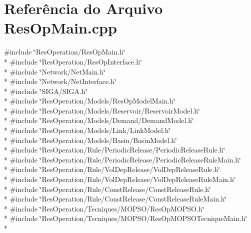 \section{Referência do Arquivo Res\+Op\+Main.\+cpp}
\label{_res_op_main_8cpp}
{\ttfamily \#include \char`\"{}Res\+Operation/\+Res\+Op\+Main.\+h\char`\"{}}\\*
{\ttfamily \#include \char`\"{}Res\+Operation/\+Res\+Op\+Interface.\+h\char`\"{}}\\*
{\ttfamily \#include \char`\"{}Network/\+Net\+Main.\+h\char`\"{}}\\*
{\ttfamily \#include \char`\"{}Network/\+Net\+Interface.\+h\char`\"{}}\\*
{\ttfamily \#include \char`\"{}S\+I\+G\+A/\+S\+I\+G\+A.\+h\char`\"{}}\\*
{\ttfamily \#include \char`\"{}Res\+Operation/\+Models/\+Res\+Op\+Model\+Main.\+h\char`\"{}}\\*
{\ttfamily \#include \char`\"{}Res\+Operation/\+Models/\+Reservoir/\+Reservoir\+Model.\+h\char`\"{}}\\*
{\ttfamily \#include \char`\"{}Res\+Operation/\+Models/\+Demand/\+Demand\+Model.\+h\char`\"{}}\\*
{\ttfamily \#include \char`\"{}Res\+Operation/\+Models/\+Link/\+Link\+Model.\+h\char`\"{}}\\*
{\ttfamily \#include \char`\"{}Res\+Operation/\+Models/\+Basin/\+Basin\+Model.\+h\char`\"{}}\\*
{\ttfamily \#include \char`\"{}Res\+Operation/\+Rule/\+Periodic\+Release/\+Periodic\+Release\+Rule.\+h\char`\"{}}\\*
{\ttfamily \#include \char`\"{}Res\+Operation/\+Rule/\+Periodic\+Release/\+Periodic\+Release\+Rule\+Main.\+h\char`\"{}}\\*
{\ttfamily \#include \char`\"{}Res\+Operation/\+Rule/\+Vol\+Dep\+Release/\+Vol\+Dep\+Release\+Rule.\+h\char`\"{}}\\*
{\ttfamily \#include \char`\"{}Res\+Operation/\+Rule/\+Vol\+Dep\+Release/\+Vol\+Dep\+Release\+Rule\+Main.\+h\char`\"{}}\\*
{\ttfamily \#include \char`\"{}Res\+Operation/\+Rule/\+Const\+Release/\+Const\+Release\+Rule.\+h\char`\"{}}\\*
{\ttfamily \#include \char`\"{}Res\+Operation/\+Rule/\+Const\+Release/\+Const\+Release\+Rule\+Main.\+h\char`\"{}}\\*
{\ttfamily \#include \char`\"{}Res\+Operation/\+Tecniques/\+M\+O\+P\+S\+O/\+Res\+Op\+M\+O\+P\+S\+O.\+h\char`\"{}}\\*
{\ttfamily \#include \char`\"{}Res\+Operation/\+Tecniques/\+M\+O\+P\+S\+O/\+Res\+Op\+M\+O\+P\+S\+O\+Tecnique\+Main.\+h\char`\"{}}\\*
